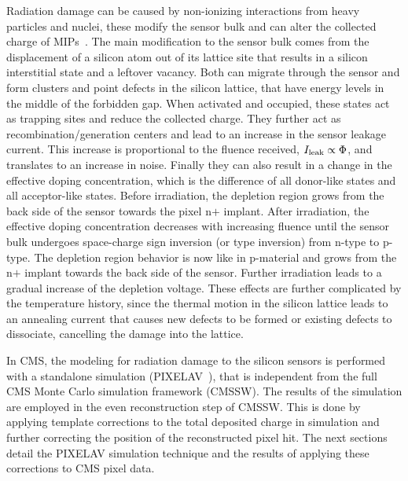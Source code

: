 Radiation damage can be caused by non-ionizing interactions from heavy particles and nuclei, these modify the sensor bulk and can alter the collected charge of MIPs~\cite{thesis,Aaboud:2019wgd}. 
The main modification to the sensor bulk comes from the displacement of a silicon atom out of its lattice site that results in a silicon interstitial state and a leftover vacancy. 
Both can migrate through the sensor and form clusters and point defects in the silicon lattice, that have energy levels in the middle of the forbidden gap. 
When activated and occupied, these states act as trapping sites and reduce the collected charge. 
They further act as recombination/generation centers and lead to an increase in the sensor leakage current.
This increase is proportional to the fluence received, $I_{\rm leak} \propto \Phi$, and translates to an increase in noise.
Finally they can also result in a change in the effective doping concentration, which is the difference of all donor-like states and all acceptor-like states.
Before irradiation, the depletion region grows from the back side of the sensor towards the pixel n$+$ implant.
After irradiation, the effective doping concentration decreases with increasing fluence until the sensor bulk undergoes space-charge sign inversion (or type inversion) from n-type to p-type.
The depletion region behavior is now like in p-material and grows from the n$+$ implant towards the back side of the sensor. 
Further irradiation leads to a gradual increase of the depletion voltage.
These effects are further complicated by the temperature history, since the thermal motion in the silicon lattice leads to an annealing current that causes new defects to be formed or existing defects to dissociate, cancelling the damage into the lattice.

In CMS, the modeling for radiation damage to the silicon sensors is performed with a standalone simulation (PIXELAV~\cite{pixelav,doublee}), that is independent from the full CMS Monte Carlo simulation framework (CMSSW). The results of the simulation are employed in the even reconstruction step of CMSSW. This is done by applying template corrections to the total deposited charge in simulation and further correcting the position of the reconstructed pixel hit. The next sections detail the PIXELAV simulation technique and the results of applying these corrections to CMS pixel data.

